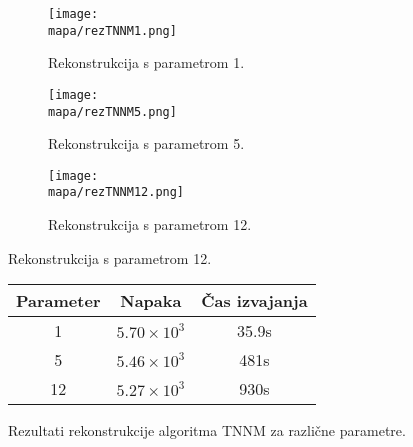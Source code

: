 \renewcommand{\mapa}{Poglavja/Slike/informacija ranga}
\begin{figure}[!ht]
    \begin{subfigure}{0.325\linewidth}
        \texttt{[image: \\mapa/rezTNNM1.png]}
        \caption{Rekonstrukcija s parametrom 1.}
    \end{subfigure}
    \hfill
    \begin{subfigure}{0.325\linewidth}
        \texttt{[image: \\mapa/rezTNNM5.png]}
        \caption{Rekonstrukcija s parametrom 5.}
    \end{subfigure}
    \hfill
    \begin{subfigure}{0.325\linewidth}
        \texttt{[image: \\mapa/rezTNNM12.png]}
        \caption{Rekonstrukcija s parametrom 12.}
    \end{subfigure}
\end{figure}

\begin{figure}[h]
    \centering
    \begin{tabular}{|c|c|c|}
        \hline
        Parameter & Napaka & Čas izvajanja \\
        \hline
        1 & $5.70 \times 10^{3}$ & 35.9s \\
        5 & $5.46 \times 10^{3}$ & 481s \\
        12 & $5.27 \times 10^{3}$ & 930s \\
        \hline
    \end{tabular}
    \caption{Rezultati rekonstrukcije algoritma TNNM za različne parametre.}
\end{figure}
